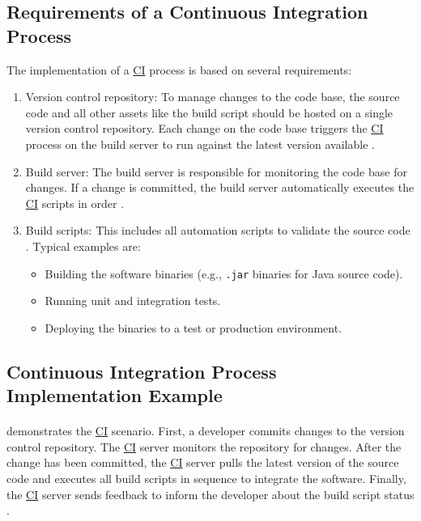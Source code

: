 \subsection{Requirements of a Continuous Integration Process}
\label{sec:02_depl-pipeline_requirements}
The implementation of a \hyperlink{abbr:ci}{CI} process is based on several requirements:
\begin{enumerate}
\item Version control repository:
To manage changes to the code base, the source code and all other assets like the build script should be hosted on a single version control repository.
Each change on the code base triggers the \hyperlink{abbr:ci}{CI} process on the build server to run against the latest version available \cite{Duvall2007CI}.

\item Build server:
The build server is responsible for monitoring the code base for changes.
If a change is committed, the build server automatically executes the \hyperlink{abbr:ci}{CI} scripts in order \cite{Rossel2017CICD, Duvall2007CI}.

\item Build scripts:
This includes all automation scripts to validate the source code \cite{Duvall2007CI}. Typical examples are:
\begin{itemize}
\item Building the software binaries (e.g., \texttt{.jar} binaries for Java source code).
\item Running unit and integration tests.
\item Deploying the binaries to a test or production environment.
\end{itemize}
\end{enumerate}


\subsection{Continuous Integration Process Implementation Example}
\paragraph{} demonstrates the \hyperlink{abbr:ci}{CI} scenario.
First, a developer commits changes to the version control repository.
The \hyperlink{abbr:ci}{CI} server monitors the repository for changes. After the change has been committed, the \hyperlink{abbr:ci}{CI} server pulls the latest version of the source code and executes all build scripts in sequence to integrate the software.
Finally, the \hyperlink{abbr:ci}{CI} server sends feedback to inform the developer about the build script status  \cite{Duvall2007CI}.


